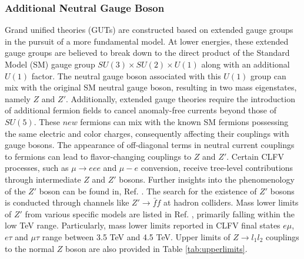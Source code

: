 \subsubsection{Additional Neutral Gauge Boson}
Grand unified theories (GUTs) are constructed based on extended gauge groups in the pursuit of a more fundamental model. At lower energies, these extended gauge groups are believed to break down to the direct product of the Standard Model (SM) gauge group $SU(3) \times SU(2) \times U(1)$ along with an additional $U(1)$ factor. The neutral gauge boson associated with this $U(1)$ group can mix with the original SM neutral gauge boson, resulting in two mass eigenstates, namely $Z$ and $Z'$. Additionally, extended gauge theories require the introduction of additional fermion fields to cancel anomaly-free currents beyond those of $SU(5)$. These $new$ fermions can mix with the known SM fermions possessing the same electric and color charges, consequently affecting their couplings with gauge bosons. The appearance of off-diagonal terms in neutral current couplings to fermions can lead to flavor-changing couplings to $Z$ and $Z'$. Certain CLFV processes, such as $\mu \rightarrow eee$ and $\mu-e$ conversion, receive tree-level contributions through intermediate $Z$ and $Z'$ bosons. Further insights into the phenomenology of the $Z'$ boson can be found in, Ref. \cite{Leike_1999}. The search for the existence of $Z'$ bosons is conducted through channels like $Z' \rightarrow \bar{f}f$ at hadron colliders. Mass lower limits of $Z'$ from various specific models are listed in Ref. \cite{zyla}, primarily falling within the low TeV range. Particularly, mass lower limits reported in CLFV final states $e\mu$, $e\tau$ and $\mu\tau$ range between 3.5 TeV and 4.5 TeV. Upper limits of $Z \rightarrow l_1 l_2$ couplings to the normal $Z$ boson are also provided in Table \ref{tab:upperlimits}.

% 
